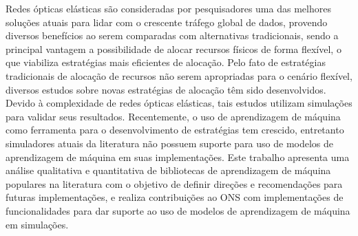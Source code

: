 Redes ópticas elásticas são consideradas por pesquisadores uma das melhores soluções atuais para lidar com o crescente tráfego global de dados, provendo diversos benefícios ao serem comparadas com alternativas tradicionais, sendo a principal vantagem a possibilidade de alocar recursos físicos de forma flexível, o que viabiliza estratégias mais eficientes de alocação. Pelo fato de estratégias tradicionais de alocação de recursos não serem apropriadas para o cenário flexível, diversos estudos sobre novas estratégias de alocação têm sido desenvolvidos. Devido à complexidade de redes ópticas elásticas, tais estudos utilizam simulações para validar seus resultados. Recentemente, o uso de aprendizagem de máquina como ferramenta para o desenvolvimento de estratégias tem crescido, entretanto simuladores atuais da literatura não possuem suporte para uso de modelos de aprendizagem de máquina em suas implementações. Este trabalho apresenta uma análise qualitativa e quantitativa de bibliotecas de aprendizagem de máquina populares na literatura com o objetivo de definir direções e recomendações para futuras implementações, e realiza contribuições ao \acrfull{ONS} com implementações de funcionalidades para dar suporte ao uso de modelos de aprendizagem de máquina em simulações.